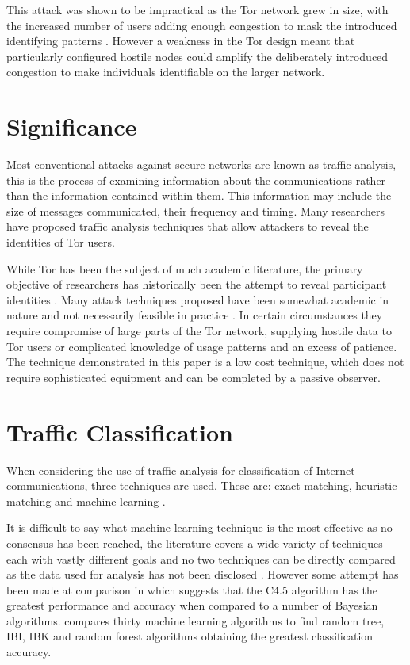\documentclass[conference]{IEEEtran}
\begin{document}
This attack was shown to be impractical as the Tor network grew in size, with
the increased number of users adding enough congestion to mask the introduced
identifying patterns \parencite{Evans:2009p315}. However a weakness in the Tor
design meant that particularly configured hostile nodes could amplify the
deliberately introduced congestion to make individuals identifiable on the
larger network.

\section{Significance}

Most conventional attacks against secure networks are known as traffic analysis,
this is the process of examining information about the communications rather
than the information contained within them. This information may include the
size of messages communicated, their frequency and timing. Many researchers have
proposed traffic analysis techniques that allow attackers to reveal the
identities of Tor users.

While Tor has been the subject of much academic literature, the primary
objective of researchers has historically been the attempt to reveal participant
identities \parencite[3]{Murdoch:2005p325}.  Many attack techniques proposed
have been somewhat academic in nature and not necessarily feasible in practice
\parencite{Raccoon:2008fk}. In certain circumstances they require compromise of
large parts of the Tor network, supplying hostile data to Tor users or
complicated knowledge of usage patterns and an excess of patience. The
technique demonstrated in this paper is a low cost technique, which does not
require sophisticated equipment and can be completed by a passive observer.

\section{Traffic Classification}

When considering the use of traffic analysis for classification of Internet
communications, three techniques are used. These are: exact matching, heuristic
matching and machine learning \parencite{Zhang:2009p1188}.

It is difficult to say what machine learning technique is the most effective as
no consensus has been reached, the literature covers a wide variety of
techniques each with vastly different goals and no two techniques can be
directly compared as the data used for analysis has not been disclosed
\parencite{Kim:2007p3867}. However some attempt has been made at comparison in
\textcite{Williams:2006p3849} which suggests that the C4.5 algorithm has the
greatest performance and accuracy when compared to a number of Bayesian
algorithms. \textcite{Mohd:2009p6484} compares thirty machine learning
algorithms to find random tree, IBI, IBK and random forest algorithms
obtaining the greatest classification accuracy.
\end{document}
